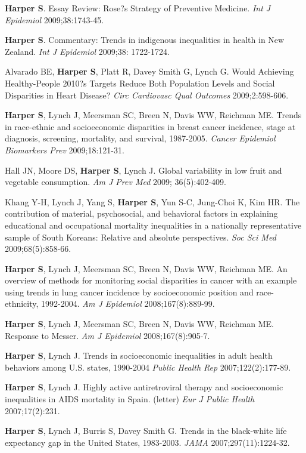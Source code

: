 \documentclass[
  letterpaper,
  DIV=11,
  numbers=noendperiod]{scrartcl}
\begin{document}
\textbf{Harper S}. Essay Review: Rose?s Strategy of Preventive Medicine.
\emph{Int J Epidemiol} 2009;38:1743-45.

\textbf{Harper S}. Commentary: Trends in indigenous inequalities in
health in New Zealand. \emph{Int J Epidemiol} 2009;38: 1722-1724.

Alvarado BE, \textbf{Harper S}, Platt R, Davey Smith G, Lynch G. Would
Achieving Healthy-People 2010?s Targets Reduce Both Population Levels
and Social Disparities in Heart Disease? \emph{Circ Cardiovasc Qual
Outcomes} 2009;2:598-606.

\textbf{Harper S}, Lynch J, Meersman SC, Breen N, Davis WW, Reichman ME.
Trends in race-ethnic and socioeconomic disparities in breast cancer
incidence, stage at diagnosis, screening, mortality, and survival,
1987-2005. \emph{Cancer Epidemiol Biomarkers Prev} 2009;18:121-31.

Hall JN, Moore DS, \textbf{Harper S}, Lynch J. Global variability in low
fruit and vegetable consumption. \emph{Am J Prev Med} 2009;
36(5):402-409.

Khang Y-H, Lynch J, Yang S, \textbf{Harper S}, Yun S-C, Jung-Choi K, Kim
HR. The contribution of material, psychosocial, and behavioral factors
in explaining educational and occupational mortality inequalities in a
nationally representative sample of South Koreans: Relative and absolute
perspectives. \emph{Soc Sci Med} 2009;68(5):858-66.

\textbf{Harper S}, Lynch J, Meersman SC, Breen N, Davis WW, Reichman ME.
An overview of methods for monitoring social disparities in cancer with
an example using trends in lung cancer incidence by socioeconomic
position and race-ethnicity, 1992-2004. \emph{Am J Epidemiol}
2008;167(8):889-99.

\textbf{Harper S}, Lynch J, Meersman SC, Breen N, Davis WW, Reichman ME.
Response to Messer. \emph{Am J Epidemiol} 2008;167(8):905-7.

\textbf{Harper S}, Lynch J. Trends in socioeconomic inequalities in
adult health behaviors among U.S. states, 1990-2004 \emph{Public Health
Rep} 2007;122(2):177-89.

\textbf{Harper S}, Lynch J. Highly active antiretroviral therapy and
socioeconomic inequalities in AIDS mortality in Spain. (letter)
\emph{Eur J Public Health} 2007;17(2):231.

\textbf{Harper S}, Lynch J, Burris S, Davey Smith G. Trends in the
black-white life expectancy gap in the United States, 1983-2003.
\emph{JAMA} 2007;297(11):1224-32.
\end{document}

